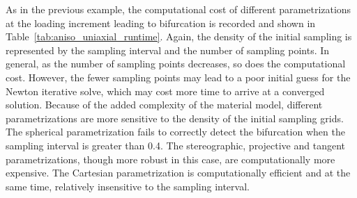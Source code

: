 \documentclass[12pt]{article}
\numberwithin{equation}{section}
\begin{document}
As in the previous example, the computational cost of different 
parametrizations at the loading increment leading to bifurcation is 
recorded and shown in Table~\ref{tab:aniso_uniaxial_runtime}. Again, 
the density of the initial sampling is represented by the sampling 
interval and the number of sampling points. In general, as the number 
of sampling points decreases, so does the computational cost. However, 
the fewer sampling points may lead to a poor initial guess for the 
Newton iterative solve, which may cost more time to arrive at a 
converged solution. Because of the added complexity of the material 
model, different parametrizations are more sensitive to the density of 
the initial sampling grids. The spherical parametrization fails to 
correctly detect the bifurcation when the sampling interval is greater 
than 0.4. The stereographic, projective and tangent parametrizations, 
though more robust in this case, are computationally more expensive. 
The Cartesian parametrization is computationally efficient and at the 
same time, relatively insensitive to the sampling interval. 
\end{document}
